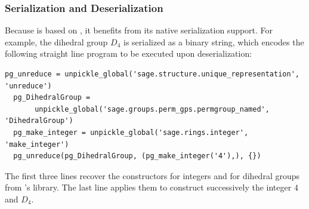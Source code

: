 
\subsubsection{Serialization and Deserialization}

Because \Sage is based on \Python, it benefits from its native serialization support.
For example, the dihedral group $D_4$ is serialized as a binary string, which encodes the following straight line program to be executed upon deserialization:
\begin{lstlisting}[]
  pg_unreduce = unpickle_global('sage.structure.unique_representation', 'unreduce')
  pg_DihedralGroup = 
       unpickle_global('sage.groups.perm_gps.permgroup_named', 'DihedralGroup')
  pg_make_integer = unpickle_global('sage.rings.integer', 'make_integer')
  pg_unreduce(pg_DihedralGroup, (pg_make_integer('4'),), {})
\end{lstlisting}
The first three lines recover the constructors for integers and for dihedral groups from \Sage's library.
The last line applies them to construct successively the integer $4$ and $D_4$.

